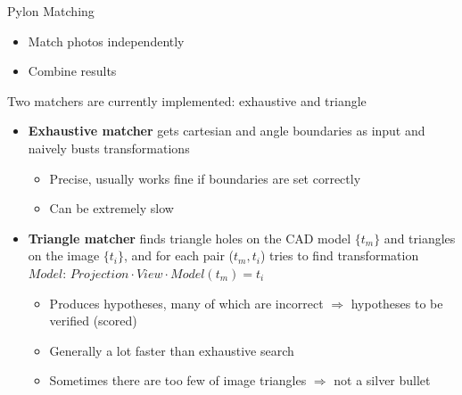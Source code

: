 \documentclass{beamer}
\begin{document}
\begin{frame}[t, fragile]{Pylon Matching}
\begin{itemize} 
\item Match photos independently
\item Combine results
\end{itemize}

Two matchers are currently implemented: exhaustive and triangle
\begin{itemize} 
\item \textbf{Exhaustive matcher} gets cartesian and angle boundaries as input and naively busts transformations   
\begin{itemize} 
\item Precise, usually works fine if boundaries are set correctly
\item Can be extremely slow
\end{itemize} 
\item \textbf{Triangle matcher} finds triangle holes on the CAD model $\{t_m\}$ and triangles on the image $\{t_i\}$, and for each pair ($t_m, t_i$) tries to find transformation $Model$: $Projection \cdot View \cdot Model(t_m) = t_i$   
\begin{itemize}
\item Produces hypotheses, many of which are incorrect $\Rightarrow$ hypotheses to be verified (scored)
\item Generally a lot faster than exhaustive search
\item Sometimes there are too few of image triangles $\Rightarrow$ not a silver bullet
 
\end{itemize}
\end{itemize}

\end{frame}
\end{document}

